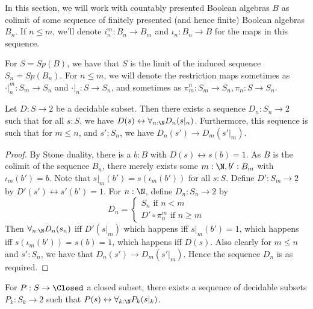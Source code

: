 
In this section, we will work with countably presented Boolean algebras $B$ 
as colimit of some sequence of finitely presented (and hence finite) Boolean algebras $B_n$. 
If $n\leq m$, we'll denote $i^m_n:B_n\to B_m$ and $\iota_n:B_n\to B$ for the maps in this sequence. 

For $S=Sp(B)$, we have that $S$ is the limit of the induced sequence $S_n = Sp(B_n)$. 
For $n\leq m$, we will denote the restriction maps sometimes as $ \cdot |^m_n : S_m \to S_n$ and $\cdot|_n :S\to S_n$, 
and sometimes as $\pi_m^n:S_m \to S_n, \pi_n : S\to S_n$. 

\begin{lemma}\label{DecidableSubsetOfStoneApproximation}
  Let $D:S\to 2$ be a decidable subset. 
  Then there exists a sequence $D_n:S_n \to 2$ such that for all $s:S$, we have 
  $D(s) \leftrightarrow \forall_{n:\N} D_n(s|_n)$. 
  Furthermore, this sequence is such that for $m\leq n$, and $s':S_n$, we have $D_n(s')\to D_m(s'|_m)$.
\end{lemma}
\begin{proof}
  By Stone duality, there is a $b:B$ with $D(s) \leftrightarrow s(b) = 1$. 
  As $B$ is the colimit of the sequence $B_n$, there merely exists some $m:\N, b':B_m$ with 
  $\iota_m(b') = b$. 
  Note that $s|_m (b') = s(\iota_m(b'))$ for all $s:S$. 
  Define $D' :S_m \to 2 $ by $D'(s')\leftrightarrow s'(b') = 1$. 
  For $n:\N$, define $D_n:S_n \to 2$ by 
  \begin{equation}
    D_n = \begin{cases}
      S_n \text{ if } n < m \\
      D'\circ \pi_n^m \text { if } n\geq m
    \end{cases}
  \end{equation}
  Then $\forall_{n:\N} D_n(s_n)$ iff $D'(s|_m)$ which happens iff $s|_m(b') = 1$, 
  which happens iff $s(\iota_m(b')) = s(b) = 1$, which happens iff $D(s)$.
  Also clearly for $m\leq n$ and $s':S_n$, we have that $D_n(s')\to D_m(s'|_m)$. 
  Hence the sequence $D_n$ is as required. 
\end{proof} 
\begin{corollary}
  For $P:S\to \Closed$ a closed subset, there exists a sequence
  of decidable subsets $P_k:S_k \to 2$ such that $P(s) \leftrightarrow \forall_{k:\N} P_k(s|_k)$. 
\end{corollary}
